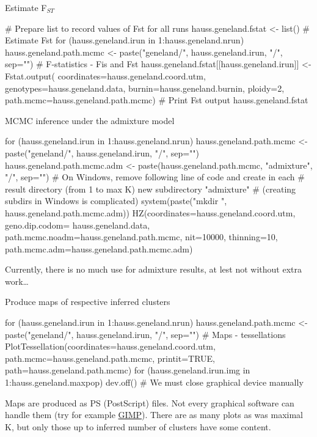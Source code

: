 \documentclass[compress, ucs, xelatex, 11pt, xcolor=svgnames,
  hyperref={
    bookmarks=true,
    unicode=true,
    colorlinks=true,
    pdftitle={Molecular data in R},
    plainpages=false,
    pdfauthor={Vojtech Zeisek},
    pdfsubject={Course about phylogeny and evolution in R},
    pdfcreator={XeLaTeX},
    pdfkeywords={R, evolution, phylogeny, molecular data},
    linkcolor=Tomato,
    anchorcolor=SaddleBrown,
    citecolor=Goldenrod,
    filecolor=DarkMagenta,
    menucolor=Sienna,
    urlcolor=DarkTurquoise,
    pdftex},
  url={hyphens, lowtilde} %
  ]{beamer}
\begin{document}
\begin{frame}[fragile]{Estimate F$_{ST}$}
  \begin{spluscode}
    # Prepare list to record values of Fst for all runs
    hauss.geneland.fstat <- list()
    # Estimate Fst
    for (hauss.geneland.irun in 1:hauss.geneland.nrun) {
      hauss.geneland.path.mcmc <- paste("geneland/",
	hauss.geneland.irun, "/", sep="")
      # F-statistics - Fis and Fst
      hauss.geneland.fstat[[hauss.geneland.irun]] <- Fstat.output(
        coordinates=hauss.geneland.coord.utm,
        genotypes=hauss.geneland.data,
        burnin=hauss.geneland.burnin, ploidy=2,
        path.mcmc=hauss.geneland.path.mcmc)
      }
      # Print Fst output
      hauss.geneland.fstat
  \end{spluscode}
\end{frame}

\begin{frame}[fragile]{MCMC inference under the admixture model}
  \begin{spluscode}
    for (hauss.geneland.irun in 1:hauss.geneland.nrun) {
      hauss.geneland.path.mcmc <- paste("geneland/",
        hauss.geneland.irun, "/", sep="")
      hauss.geneland.path.mcmc.adm <- paste(hauss.geneland.path.mcmc,
        "admixture", "/", sep="")
      # On Windows, remove following line of code and create in each
      # result directory (from 1 to max K) new subdirectory "admixture"
      # (creating subdirs in Windows is complicated)
      system(paste("mkdir ", hauss.geneland.path.mcmc.adm))
      HZ(coordinates=hauss.geneland.coord.utm, geno.dip.codom=
        hauss.geneland.data, path.mcmc.noadm=hauss.geneland.path.mcmc,
        nit=10000, thinning=10,
        path.mcmc.adm=hauss.geneland.path.mcmc.adm)
      }
  \end{spluscode}
\vfil
Currently, there is no much use for admixture results, at lest not without extra work\ldots
\end{frame}

\begin{frame}[fragile]{Produce maps of respective inferred clusters}
  \begin{spluscode}
    for (hauss.geneland.irun in 1:hauss.geneland.nrun) {
      hauss.geneland.path.mcmc <- paste("geneland/",
        hauss.geneland.irun, "/", sep="")
      # Maps - tessellations
      PlotTessellation(coordinates=hauss.geneland.coord.utm,
        path.mcmc=hauss.geneland.path.mcmc, printit=TRUE,
        path=hauss.geneland.path.mcmc)
      for (hauss.geneland.irun.img in 1:hauss.geneland.maxpop) {
        dev.off() } # We must close graphical device manually
      }
  \end{spluscode}
\vfil
Maps are produced as PS (PostScript) files. Not every graphical software can handle them (try for example \href{https://www.gimp.org/}{GIMP}). There are as many plots as was maximal K, but only those up to inferred number of clusters have some content.
\end{frame}
\end{document}
